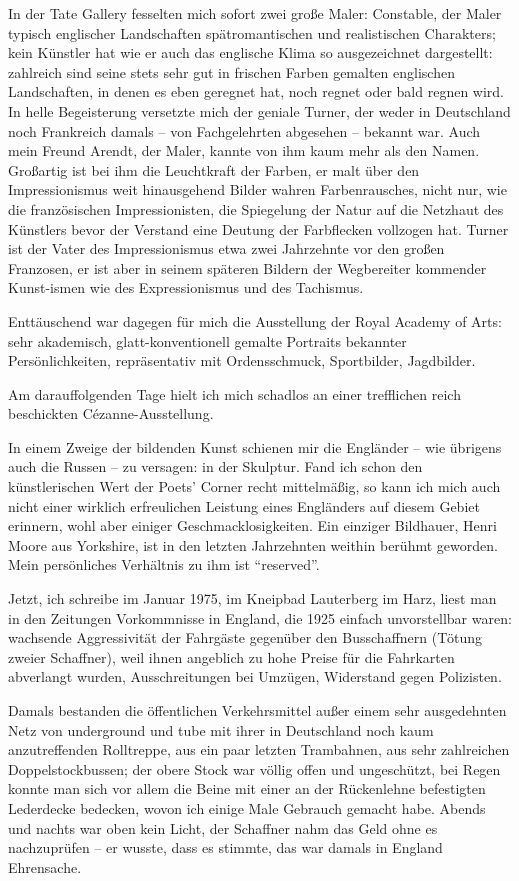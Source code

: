 In der Tate Gallery fesselten mich sofort zwei große Maler: Constable, der Maler typisch englischer Landschaften spätromantischen und realistischen Charakters; kein Künstler hat wie er auch das englische Klima so ausgezeichnet dargestellt: zahlreich sind seine stets sehr gut in frischen Farben gemalten englischen Landschaften, in denen es eben geregnet hat, noch regnet oder bald regnen wird. In helle Begeisterung versetzte mich der geniale Turner, der weder in Deutschland noch Frankreich damals -- von Fachgelehrten abgesehen -- bekannt war. Auch mein Freund Arendt, der Maler, kannte von ihm kaum mehr als den Namen. Großartig ist bei ihm die Leuchtkraft der Farben, er malt über den Impressionismus weit hinausgehend Bilder wahren Farbenrausches, nicht nur, wie die französischen Impressionisten, die Spiegelung der Natur auf die Netzhaut des Künstlers bevor der Verstand eine Deutung der Farbflecken vollzogen hat. Turner ist der Vater des Impressionismus etwa zwei Jahrzehnte vor den großen Franzosen, er ist aber in seinem späteren Bildern der Wegbereiter kommender Kunst-ismen wie des Expressionismus und des Tachismus.

Enttäuschend war dagegen für mich die Ausstellung der Royal Academy of Arts: sehr akademisch, glatt-konventionell gemalte Portraits bekannter Persönlichkeiten, repräsentativ mit Ordensschmuck, Sportbilder, Jagdbilder.

Am darauffolgenden Tage hielt ich mich schadlos an einer trefflichen reich beschickten Cézanne-Ausstellung.

In einem Zweige der bildenden Kunst schienen mir die Engländer -- wie übrigens auch die Russen -- zu versagen: in der Skulptur. Fand ich schon den künstlerischen Wert der Poets' Corner recht mittelmäßig, so kann ich mich auch nicht einer wirklich erfreulichen Leistung eines Engländers auf diesem Gebiet erinnern, wohl aber einiger Geschmacklosigkeiten. Ein einziger Bildhauer, Henri Moore aus Yorkshire, ist in den letzten Jahrzehnten weithin berühmt geworden. Mein persönliches Verhältnis zu ihm ist \enquote{reserved}.

Jetzt, ich schreibe im Januar 1975, im Kneipbad Lauterberg im Harz, liest man in den Zeitungen Vorkommnisse in England, die 1925 einfach unvorstellbar waren: wachsende Aggressivität der Fahrgäste gegenüber den Busschaffnern (Tötung zweier Schaffner), weil ihnen angeblich zu hohe Preise für die Fahrkarten abverlangt wurden, Ausschreitungen bei Umzügen, Widerstand gegen Polizisten.

Damals bestanden die öffentlichen Verkehrsmittel außer einem sehr ausgedehnten Netz von underground und tube mit ihrer in Deutschland noch kaum anzutreffenden Rolltreppe, aus ein paar letzten Trambahnen, aus sehr zahlreichen Doppelstockbussen; der obere Stock war völlig offen und ungeschützt, bei Regen konnte man sich vor allem die Beine mit einer an der Rückenlehne befestigten Lederdecke bedecken, wovon ich einige Male Gebrauch gemacht habe. Abends und nachts war oben kein Licht, der Schaffner nahm das Geld ohne es nachzuprüfen -- er wusste, dass es stimmte, das war damals in England Ehrensache.


